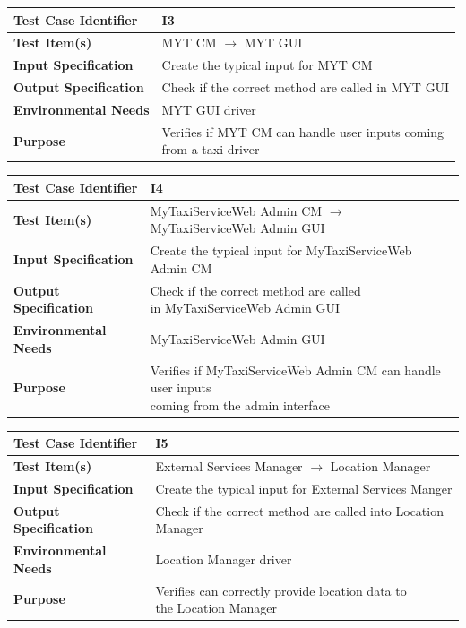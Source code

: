 \documentclass[11pt,titlepage]{article} %
\begin{document}
  \begin{table}[ht!]
    \begin{tabular*}{16cm}{ll}
	\hline
	\textbf{Test Case Identifier} & I3\\
	\hline
	\textbf{Test Item(s)} & MYT CM $ \longrightarrow $ MYT GUI \\
	\hline
	\textbf{Input Specification} & Create the typical input for MYT CM\\
	\hline
	\textbf{Output Specification} & Check if the correct method are called in MYT GUI\\
	\hline
	\textbf{Environmental Needs} & MYT GUI driver \\
	\hline 
	\textbf{Purpose} & \pbox{20cm}{Verifies if MYT CM can handle user inputs coming \\ from a taxi driver} \\
	\hline
    \end{tabular*}
  \end{table}
  
  \begin{table}[ht!]
    \begin{tabular*}{16cm}{ll}
	\hline
	\textbf{Test Case Identifier} & I4\\
	\hline
	\textbf{Test Item(s)} & MyTaxiServiceWeb Admin CM $ \longrightarrow $ MyTaxiServiceWeb Admin GUI \\
	\hline
	\textbf{Input Specification} & Create the typical input for MyTaxiServiceWeb Admin CM\\
	\hline
	\textbf{Output Specification} & \pbox{20cm}{Check if the correct method are called \\ in MyTaxiServiceWeb Admin GUI} \\
	\hline
	\textbf{Environmental Needs} & MyTaxiServiceWeb Admin GUI\\
	\hline
	\textbf{Purpose} & \pbox{20cm}{Verifies if MyTaxiServiceWeb Admin CM can handle user inputs \\ coming from the admin interface} \\
	\hline
    \end{tabular*}
  \end{table}
  
  \begin{table}[ht!]
    \begin{tabular*}{16cm}{ll}
	\hline
	\textbf{Test Case Identifier} & I5 \\
	\hline
	\textbf{Test Item(s)} & External Services Manager  $ \longrightarrow $ Location Manager \\
	\hline
	\textbf{Input Specification} & Create the typical input for External Services Manger\\
	\hline
	\textbf{Output Specification} & Check if the correct method are called into Location Manager\\
	\hline
	\textbf{Environmental Needs} & Location Manager driver\\
	\hline
	\textbf{Purpose} & \pbox{20cm}{Verifies can correctly provide location data to \\ the Location Manager} \\
	\hline
    \end{tabular*}
  \end{table}
  
\end{document}
